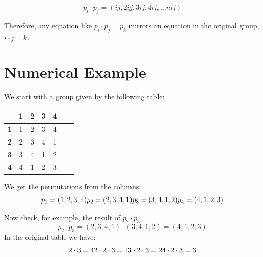 \[
p_i\cdot p_j = (ij, 2ij, 3ij, 4ij, \dots nij)
\]

Therefore, any equation like \(p_i\cdot p_j = p_k\) mirrors
an equation in the original group, \(i\cdot j = k\).

\section{Numerical Example}
We start with a group given by the following table:

\begin{center}
    \begin{tabular}{|c|c|c|c|c|c|c|}
    \hline
     & \textbf{1} & \textbf{2} & \textbf{3} & \textbf{4} \\
    \hline
    \textbf{1} & 1 & 2 & 3 & 4 \\
    \hline
    \textbf{2} & 2 & 3 & 4 & 1 \\
    \hline
    \textbf{3} & 3 & 4 & 1 & 2 \\
    \hline
    \textbf{4} & 4 & 1 & 2 & 3 \\
    \hline
    \end{tabular}
\end{center}
We get the permutations from the columns:
\[
p_1=(1,2,3,4)\\
p_2=(2,3,4,1)\\
p_3=(3,4,1,2)\\
p_4=(4,1,2,3)\\
\]

Now check, for example, the result of \(p_2\cdot p_3\).
\[
p_2\cdot p_3 = (2,3,4,1) \cdot (3,4,1,2) = (4,1,2,3)
\]
In the original table we have:
\[
2 \cdot 3 = 4\\
2 \cdot 2 \cdot 3 = 1\\
3 \cdot 2 \cdot 3 = 2\\
4 \cdot 2 \cdot 3 = 3\\
\]

